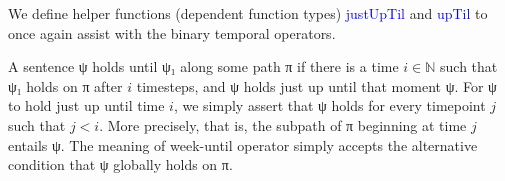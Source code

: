 \documentclass{article}
\newcommand{\blue}[1]{\textcolor{blue}{#1}}
\begin{document}
We define helper functions (dependent function types) \blue{justUpTil} and
\blue{upTil} to once again assist with the binary temporal operators.

A sentence ψ holds until ψ₁ along some path π if there is a time $i\in\mathbb{N}$ such that
ψ₁ holds on π after $i$ timesteps, and ψ holds just up until that moment ψ. For ψ
to hold just up until time $i$, we simply assert that ψ holds for every timepoint $j$ such that
$j<i$. More precisely, that is, the subpath of π beginning at time $j$ entails ψ. The meaning
of week-until operator simply accepts the alternative condition that ψ globally
holds on π.

\begin{code}%
%
\>[4]\AgdaSpace{}%
\AgdaSymbol{:}\AgdaSpace{}%
\AgdaSpace{}%
\AgdaSpace{}%
\AgdaSpace{}%
\AgdaSpace{}%
\AgdaSpace{}%
\AgdaSpace{}%
\<%
\\
%
\>[4]\AgdaSpace{}%
\AgdaSpace{}%
\AgdaSpace{}%
\AgdaSpace{}%
\AgdaSymbol{=}\AgdaSpace{}%
\AgdaSpace{}%
\AgdaSymbol{(}\AgdaSpace{}%
\AgdaSymbol{:}\AgdaSpace{}%
\AgdaSymbol{)}\AgdaSpace{}%
\AgdaSpace{}%
\AgdaSpace{}%
\AgdaSpace{}%
\AgdaSpace{}%
\AgdaSpace{}%
\AgdaSymbol{(}\AgdaSpace{}%
\AgdaSpace{}%
\AgdaSymbol{)}\AgdaSpace{}%
\AgdaSpace{}%
\<%
\\
%
\\[\AgdaEmptyExtraSkip]%
%
\>[4]\AgdaSpace{}%
\AgdaSymbol{:}\AgdaSpace{}%
\AgdaSpace{}%
\AgdaSpace{}%
\AgdaSpace{}%
\AgdaSpace{}%
\AgdaSpace{}%
\AgdaSpace{}%
\<%
\\
%
\>[4]\AgdaSpace{}%
\AgdaSpace{}%
\AgdaSpace{}%
\AgdaSpace{}%
\AgdaSymbol{=}\AgdaSpace{}%
\AgdaFunction{Σ[}\AgdaSpace{}%
\AgdaSpace{}%
\AgdaSpace{}%
\AgdaSpace{}%
\AgdaFunction{]}\AgdaSpace{}%
\AgdaSymbol{(}\AgdaSpace{}%
\AgdaSpace{}%
\AgdaSymbol{)}\AgdaSpace{}%
\AgdaSpace{}%
\AgdaSpace{}%
\AgdaSpace{}%
\AgdaSpace{}%
\AgdaSpace{}%
\AgdaSpace{}%
\<%
\end{code}
\end{document}
